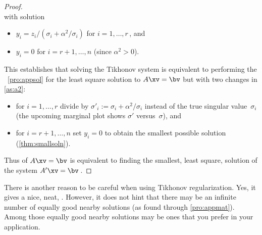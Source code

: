 \begin{proof}
\begin{equation*}
\end{equation*}
with solution 
\begin{itemize}
\item \(y_i=z_i/(\sigma_i+\alpha^2/\sigma_i)\) for \(i=1,\ldots,r\)\,, and
\item \(y_i=0\) for \(i=r+1,\ldots,n\) (since \(\alpha^2>0\)).
\end{itemize}
This establishes that solving the Tikhonov system is equivalent to performing the \svd\ \cref{pro:appsol} for the least square solution to \(A\xv=\bv\) but with two changes in \cref{as:a2}:
\begin{itemize}
\item for $i=1,\ldots,r$ divide by \(\sigma'_i:=\sigma_i+\alpha^2/\sigma_i\) instead of the true singular value~\(\sigma_i\) (the upcoming marginal plot shows \(\sigma'\) versus~\(\sigma\)), and
\item for $i=r+1,\ldots,n$ set \(y_i=0\) to obtain the smallest possible solution (\cref{thm:smallsoln}).
\end{itemize}
Thus  of \(A\xv=\bv\) is equivalent to finding the smallest, {least square}, solution of the system \(A'\xv=\bv\)\,.
\end{proof}



There is another reason to be careful when using Tikhonov regularization. 
Yes, it gives a nice, neat, .
However, it does not hint that there may be an infinite number of equally good nearby solutions (as found through \cref{pro:appmat}).
Among those equally good nearby solutions may be ones that you prefer in your application.

